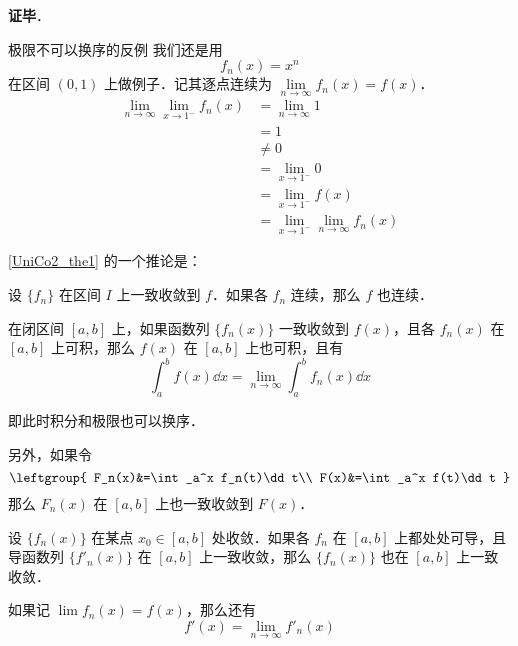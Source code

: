 
\textbf{证毕}．



\begin{example}{极限不可以换序的反例}
我们还是用
\begin{equation}
f_n(x)=x^n
\end{equation}
在区间 $(0, 1)$ 上做例子．记其逐点连续为 $\lim\limits_{n\to\infty}f_n(x)=f(x)$．
\begin{equation}
\begin{aligned}
\lim\limits_{n\to\infty}\lim\limits_{x\to 1^-}f_n(x)&=\lim\limits_{n\to\infty}1\\
&=1\\
&\not=0\\
&=\lim\limits_{x\to 1^-} 0\\
&=\lim\limits_{x\to 1^-}f(x)\\
&=\lim\limits_{x\to 1^-}\lim\limits_{n\to\infty}f_n(x)
\end{aligned}
\end{equation}
\end{example}

\autoref{UniCo2_the1} 的一个推论是：
\begin{corollary}{}
设 $\{f_n\}$ 在区间 $I$ 上一致收敛到 $f$．如果各 $f_n$ 连续，那么 $f$ 也连续．
\end{corollary}

\begin{theorem}{}
在闭区间 $[a, b]$ 上，如果函数列 $\{f_n(x)\}$ 一致收敛到 $f(x)$，且各 $f_n(x)$ 在 $[a, b]$ 上可积，那么 $f(x)$ 在 $[a, b]$ 上也可积，且有
\begin{equation}
\int_a^b f(x) \dd x=\lim_{n\to\infty}\int_a^b f_n(x)\dd x
\end{equation}

即此时积分和极限也可以换序．

另外，如果令
\begin{equation}
\leftgroup{
    F_n(x)&=\int_a^x f_n(t)\dd t\\
    F(x)&=\int_a^x f(t)\dd t
}
\end{equation}
那么 $F_n(x)$ 在 $[a, b]$ 上也一致收敛到 $F(x)$．

\end{theorem}

\begin{theorem}{}
设 $\{f_n(x)\}$ 在某点 $x_0\in [a, b]$ 处收敛．如果各 $f_n$ 在 $[a, b]$ 上都处处可导，且导函数列 $\{f'_n(x)\}$ 在 $[a, b]$ 上一致收敛，那么 $\{f_n(x)\}$ 也在 $[a, b]$ 上一致收敛．

如果记 $\lim f_n(x)=f(x)$，那么还有
\begin{equation}
f'(x)=\lim\limits_{n\to\infty}f'_n(x)
\end{equation}
\end{theorem}

















